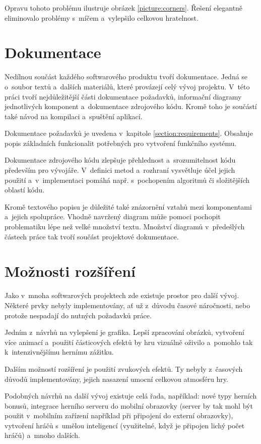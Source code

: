 \documentclass[thesis=B,czech,hidelinks]{FITthesis}[2012/06/26] %
\begin{document}
Opravu tohoto problému ilustruje obrázek \ref{picture:corners}. Řešení elegantně eliminovalo problémy s~míčem a~vylepšilo celkovou hratelnost.

\section{Dokumentace}

Nedílnou součást každého softwarového produktu tvoří dokumentace. Jedná se o~soubor textů a~dalších materiálů, které provázejí celý vývoj projektu. V~této práci tvoří nejdůležitější části dokumentace požadavků, informační diagramy jednotlivých komponent a~dokumentace zdrojového kódu. Kromě toho je součástí také návod na kompilaci a~spuštění aplikací.

Dokumentace požadavků je uvedena v~kapitole \ref{section:requirements}. Obsahuje popis základních funkcionalit potřebných pro vytvoření funkčního systému.

Dokumentace zdrojového kódu zlepšuje přehlednost a~srozumitelnost kódu především pro vývojáře. V~definici metod a~rozhraní vysvětluje účel jejich použití a~v~implementaci pomáhá např. s~pochopením algoritmů či složitějších oblastí kódu. 

Kromě textového popisu je důležité také znázornění vztahů mezi komponentami a~jejich spolupráce. Vhodně navržený diagram může pomoci pochopit problematiku lépe než velké množství textu. Množství diagramů v~předešlých částech práce tak tvoří součást projektové dokumentace.

\section{Možnosti rozšíření}

Jako v~mnoha softwarových projektech zde existuje prostor pro další vývoj. Některé prvky nebyly implementovány, ať už z~důvodu časové náročnosti, nebo protože nespadají do nutných požadavků práce.

Jedním z~návrhů na vylepšení je grafika. Lepší zpracování obrázků, vytvoření více animací a~použití částicových efektů by hru vizuálně oživilo a~pomohlo tak k~intenzivnějšímu hernímu zážitku.

Dalším možností rozšíření je použití zvukových efektů. Ty nebyly z~časových důvodů implementovány, jejich nasazení umocní celkovou atmosféru hry.

Podobných návrhů na další vývoj existuje celá řada, například: nové typy herních bonusů, integrace herního serveru do mobilní obrazovky (server by tak mohl být použit v~mobilním zařízení například při připojení do externí obrazovky), vytvoření hráčů s~umělou inteligencí (využitelné, když je připojen lichý počet hráčů) a~mnoho dalších.
\end{document}
